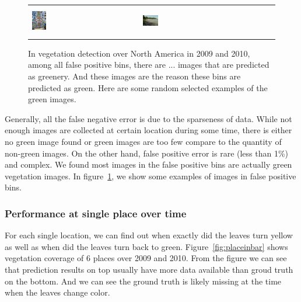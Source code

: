 \begin{figure}[th]
{{\begin{center}
\begin{tabular}{@{}c@{\,\,\,}c@{\,\,\,}c@{\,\,\,}c@{\,\,\,}c@{\,\,\,}}
\includegraphics[height=0.5in]{imggrid/falseposi/19.jpg} &
\includegraphics[width=0.08\textwidth]{imggrid/falseposi/20.jpg} \\
\end{tabular}
\end{center}
}}
\caption{In vegetation detection over North America in 2009 and 2010, among all false positive bins, there are ... images that are predicted as greenery. And these images are the reason these bins are predicted as green. Here are some random selected examples of the green images.}
\label{fig:falseposi}
\end{figure}



Generally, all the false negative error is due to the sparseness of data. 
While not enough images are collected at certain location during some time, 
there is either no green image found or green images are too few compare to 
the quantity of non-green images. On the other hand, false positive error is rare 
(less than 1\%) and complex. We found most images in the false positive bins are actually green vegetation images. 
In figure~\ref{fig:falseposi}, we show some examples of images in false positive bins.



\subsubsection{Performance at single place over time}
For each single location, we can find out when exactly did the leaves turn yellow as well as when
did the leaves turn back to green. 
Figure~\ref{fig:placeinbar} shows vegetation coverage of 6 places over 2009 and 2010. From the figure we can see that
prediction results on top usually have more data available than groud truth on the bottom. 
And we can see the ground truth is likely missing at the time when the leaves change color. 

